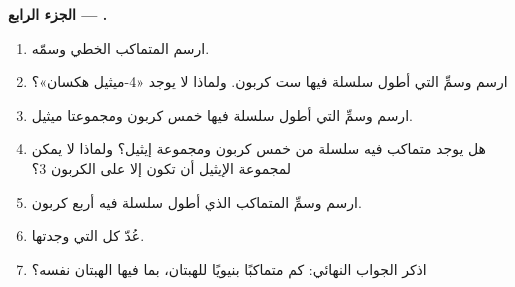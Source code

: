 \begin{problem}
\medskip
\noindent\textbf{الجزء الرابع ---  .}
\begin{enumerate}[resume]
  \item ارسم المتماكب الخطي وسمّه.
  \item ارسم وسمِّ  التي أطول سلسلة فيها ست 
        كربون. ولماذا لا يوجد «4-ميثيل هكسان»؟
  \item ارسم وسمِّ  التي أطول سلسلة فيها خمس  كربون
        ومجموعتا ميثيل.
  \item هل يوجد متماكب فيه سلسلة من خمس  كربون ومجموعة إيثيل؟
        ولماذا لا يمكن لمجموعة الإيثيل أن تكون إلا على الكربون 3؟
  \item ارسم وسمِّ المتماكب الذي أطول سلسلة فيه أربع 
        كربون.
  \item عُدّ كل  التي وجدتها.
  \item اذكر الجواب النهائي: كم متماكبًا بنيويًا للهبتان،
        بما فيها الهبتان نفسه؟
\end{enumerate}
\end{problem}

